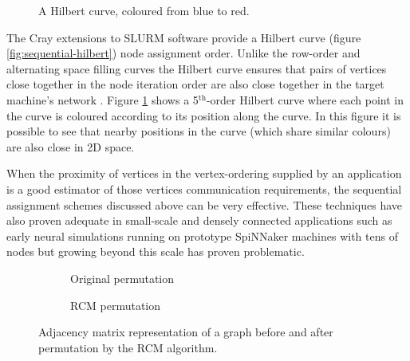 				\begin{figure}
					\center
					
					\caption{A Hilbert curve, coloured from blue to red.}
					\label{fig:hilbert-placement}
				\end{figure}
				
				The Cray extensions to SLURM software provide a Hilbert curve
				\cite{hilbert91} (figure \ref{fig:sequential-hilbert}) node assignment
				order. Unlike the row-order and alternating space filling curves the
				Hilbert curve ensures that pairs of vertices close together in the node
				iteration order are also close together in the target machine's network
				\cite{moon01, zumbusch99}. Figure \ref{fig:hilbert-placement} shows a
				5$^\textrm{th}$-order Hilbert curve where each point in the curve is
				coloured according to its position along the curve. In this figure it
				is possible to see that nearby positions in the curve (which share
				similar colours) are also close in 2D space.
				
				When the proximity of vertices in the vertex-ordering supplied by an
				application is a good estimator of those vertices communication
				requirements, the sequential assignment schemes discussed above can be
				very effective. These techniques have also proven adequate in
				small-scale and densely connected applications such as early neural
				simulations running on prototype SpiNNaker machines with tens of nodes
				\cite{galluppi10} but growing beyond this scale has proven problematic.
				
				\begin{figure}
					\center
					\begin{subfigure}{0.45\linewidth}
						\center
						
						\caption{Original permutation}
						\label{fig:rcm-initial}
					\end{subfigure}
					\begin{subfigure}{0.45\linewidth}
						\center
						
						\caption{RCM permutation}
						\label{fig:rcm-sorted}
					\end{subfigure}
					
					\caption{Adjacency matrix representation of a graph before and after
					permutation by the RCM algorithm.}
					\label{fig:rcm}
				\end{figure}
				
